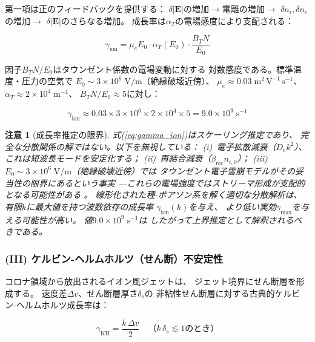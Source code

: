 \documentclass[12pt,twocolumn]{ltjsarticle}
\newtheorem{remark}{注意}
\newcommand{\ee}{\mathbf{E}}
\begin{document}
第一項は正のフィードバックを提供する：
$\delta|\ee|$の増加$\to$電離の増加$\to$
$\delta n_i, \delta n_e$の増加$\to$
$\delta|\ee|$のさらなる増加。
成長率は$\alpha_T$の電場感度により支配される：

\begin{equation}
  \gamma_{\mathrm{ion}}
  = \mu_e E_0 \cdot \alpha_T(E_0)
    \cdot \frac{B_T N}{E_0}
  \label{eq:gamma_ion}
\end{equation}

因子$B_T N / E_0$はタウンゼント係数の電場変動に対する
対数感度である。標準温度・圧力の空気で
$E_0 \sim 3 \times 10^6\;\mathrm{V/m}$（絶縁破壊近傍）、
$\mu_e \approx 0.03\;\mathrm{m^2\,V^{-1}\,s^{-1}}$、
$\alpha_T \approx 2 \times 10^4\;\mathrm{m^{-1}}$、
$B_T N / E_0 \approx 5$に対し：

\begin{equation}
  \gamma_{\mathrm{ion}}
  \approx 0.03 \times 3 \times 10^6 \times 2 \times 10^4 \times 5
  = 9.0 \times 10^9\;\mathrm{s^{-1}}
  \label{eq:gamma_ion_num}
\end{equation}

\begin{remark}[成長率推定の限界]
式(\ref{eq:gamma_ion})はスケーリング推定であり、
完全な分散関係の解ではない。以下を無視している：
(i)~電子拡散減衰（$D_e k^2$）、これは短波長モードを安定化する；
(ii)~再結合減衰（$\beta_{\mathrm{rec}} n_{i,0}$）；
(iii)~$E_0 \sim 3 \times 10^6\;\mathrm{V/m}$（絶縁破壊近傍）では
タウンゼント電子雪崩モデルがその妥当性の限界にあるという事実
---これらの電場強度ではストリーマ形成が支配的となる可能性がある
\cite{Raizer1991}。
線形化された種-ポアソン系を解く適切な分散解析は、
有限$k$に最大値を持つ波数依存の成長率
$\gamma_{\mathrm{ion}}(k)$を与え、
より低い実効$\gamma_{\max}$を与える可能性が高い。
値$9.0 \times 10^9\;\mathrm{s^{-1}}$は
したがって\emph{上界推定}として解釈されるべきである。
\end{remark}

\subsubsection{(III) ケルビン-ヘルムホルツ（せん断）不安定性}

コロナ領域から放出されるイオン風ジェットは、
ジェット境界にせん断層を形成する。
速度差$\Delta v$、せん断層厚さ$\delta_s$の
非粘性せん断層に対する古典的ケルビン-ヘルムホルツ成長率は：

\begin{equation}
  \gamma_{\mathrm{KH}}
  = \frac{k\,\Delta v}{2}
  \quad \text{（} k\,\delta_s \lesssim 1 \text{のとき）}
  \label{eq:gamma_KH}
\end{equation}
\end{document}
